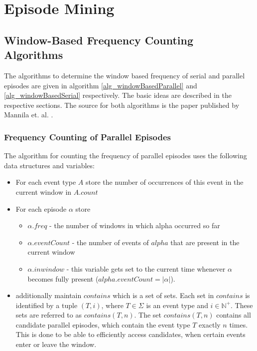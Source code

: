\chapter{Episode Mining} 

\section{Window-Based Frequency Counting Algorithms}
\label{app_freqCounting}
The algorithms to determine the window based frequency of serial and parallel episodes are given in algorithm \ref{alg_windowBasedParallel} and \ref{alg_windowBasedSerial} respectively. The basic ideas are described in the respective sections. The source for both algorithms is the paper published by Mannila et. al. \cite{mannila1997discovery}.

\subsection{Frequency Counting of Parallel Episodes}
The algorithm for counting the frequency of parallel episodes uses the following data structures and variables:

\begin{itemize}
	\item For each event type $A$ store the number of occurrences of this event in the current window in $A.count$
	\item For each episode $\alpha$ store 
	\begin{itemize}
		\item $\alpha .freq$ - the number of windows in which alpha occurred so far
		\item $\alpha. eventCount$ - the number of events of $alpha$ that are present in the current window
		\item $\alpha. inwindow$ - this variable gets set to the current time whenever $\alpha$ becomes fully present ($alpha .eventCount = |\alpha |$).
	\end{itemize}
	\item additionally maintain $contains$ which is a set of sets. Each set in $contains$ is identified by a tuple $(T,i)$, where $T \in \Sigma$ is an event type and $i \in \mathbb{N}^+$. These sets are referred to as $contains(T,n)$. The set $contains(T,n)$ contains all candidate parallel episodes, which contain the event type $T$ exactly $n$ times. This is done to be able to efficiently access candidates, when certain events enter or leave the window.
\end{itemize}

